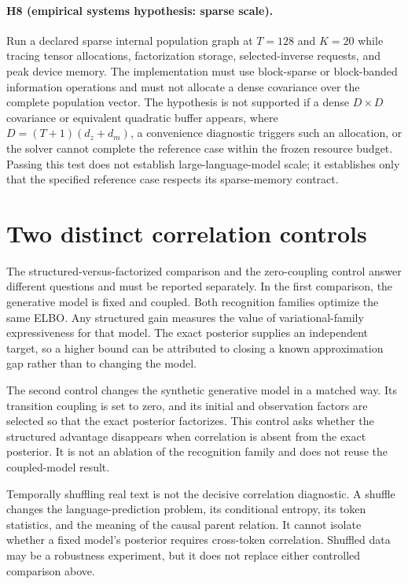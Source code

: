 \paragraph{H8 (empirical systems hypothesis: sparse scale).}
Run a declared sparse internal population graph at $T=128$ and $K=20$ while tracing tensor allocations, factorization storage, selected-inverse requests, and peak device memory. The implementation must use block-sparse or block-banded information operations and must not allocate a dense covariance over the complete population vector. The hypothesis is not supported if a dense $D\times D$ covariance or equivalent quadratic buffer appears, where $D=(T+1)(d_z+d_m)$, a convenience diagnostic triggers such an allocation, or the solver cannot complete the reference case within the frozen resource budget. Passing this test does not establish large-language-model scale; it establishes only that the specified reference case respects its sparse-memory contract.

\section{Two distinct correlation controls}

The structured-versus-factorized comparison and the zero-coupling control answer different questions and must be reported separately. In the first comparison, the generative model is fixed and coupled. Both recognition families optimize the same ELBO. Any structured gain measures the value of variational-family expressiveness for that model. The exact posterior supplies an independent target, so a higher bound can be attributed to closing a known approximation gap rather than to changing the model.

The second control changes the synthetic generative model in a matched way. Its transition coupling is set to zero, and its initial and observation factors are selected so that the exact posterior factorizes. This control asks whether the structured advantage disappears when correlation is absent from the exact posterior. It is not an ablation of the recognition family and does not reuse the coupled-model result.

Temporally shuffling real text is not the decisive correlation diagnostic. A shuffle changes the language-prediction problem, its conditional entropy, its token statistics, and the meaning of the causal parent relation. It cannot isolate whether a fixed model's posterior requires cross-token correlation. Shuffled data may be a robustness experiment, but it does not replace either controlled comparison above.

